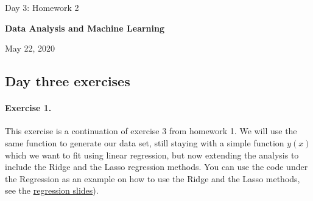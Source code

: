 \documentclass[%
oneside,                 %
final,                   %
10pt]{article}
\begin{document}

\newcommand{\exercisesection}[1]{\subsection*{#1}}






\thispagestyle{empty}

\begin{center}
{\LARGE\bf
\begin{spacing}{1.25}
Day 3: Homework 2
\end{spacing}
}
\end{center}


\begin{center}
{\bf Data Analysis and Machine Learning${}^{}$} \\ [0mm]
\end{center}

\begin{center}
\end{center}
    

\begin{center}
May 22, 2020
\end{center}

\vspace{1cm}


\subsection{Day three exercises}


\paragraph{Exercise 1.}
This exercise is a continuation of exercise 3 from homework 1. We will
use the same function to generate our data set, still staying with a
simple function $y(x)$ which we want to fit using linear regression,
but now extending the analysis to include the Ridge and the Lasso
regression methods. You can use the code under the Regression as an example on how to use the Ridge and the Lasso methods, see the \href{{https://compphysics.github.io/MachineLearning/doc/pub/Regression/html/Regression-bs.html}}{regression slides}). 
\end{document}
